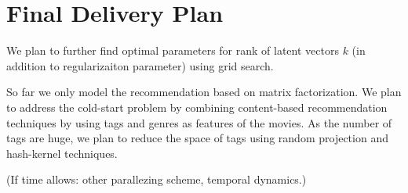 \documentclass{article} %
\begin{document}
\section{Final Delivery Plan}

We plan to further find optimal parameters for rank of latent vectors $k$
(in addition to regularizaiton parameter) using grid search.

So far we only model the recommendation based on matrix factorization.
We plan to address the cold-start problem by combining content-based recommendation techniques by using tags and genres as features of the movies.
As the number of tags are huge, we plan to reduce the space of tags using random projection and hash-kernel techniques.


(If time allows: other parallezing scheme, temporal dynamics.)



{}
\end{document}
